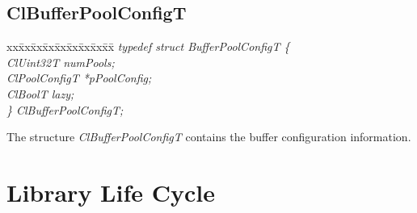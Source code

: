 \subsection{ClBufferPoolConfigT}
\begin{tabbing}
xx\=xx\=xx\=xx\=xx\=xx\=xx\=xx\=xx\=\kill
\textit{typedef struct BufferPoolConfigT \{}\\
\>\>\>\>\textit{ClUint32T numPools;}\\
\>\>\>\>\textit{ClPoolConfigT *pPoolConfig;}\\
\>\>\>\>\textit{ClBoolT lazy;}\\
\textit{\} ClBufferPoolConfigT;}\end{tabbing}
The structure \textit{ClBufferPoolConfigT} contains the buffer configuration information.


\newpage


\section{Library Life Cycle}
